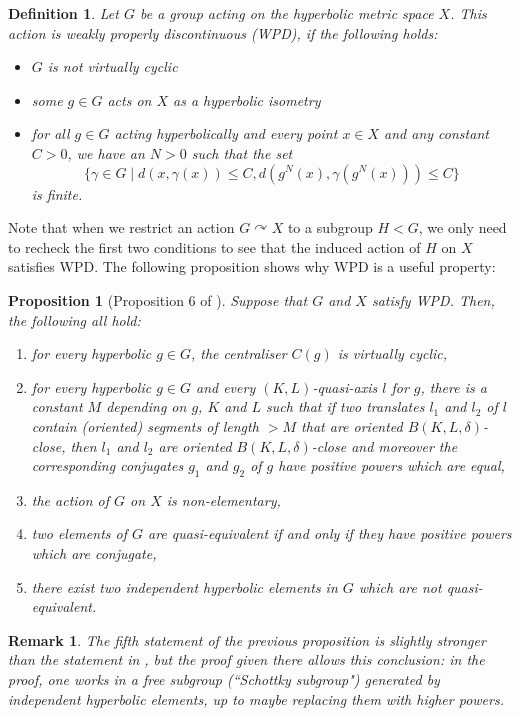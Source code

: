 \documentclass[10pt,a4paper]{amsart}
\newtheorem{remark}[theorem]{Remark}
\newtheorem{definition}[theorem]{Definition}
\newtheorem{proposition}[theorem]{Proposition}
\begin{document}
\begin{definition}\label{def:wpd}
    Let $G$ be a group acting on the hyperbolic metric space $X$.
    This action is \emph{weakly properly discontinuous (WPD)}, if the following holds: \begin{itemize}
        \item $G$ is not virtually cyclic
        \item some $g\in G$ acts on $X$ as a hyperbolic isometry
        \item for all $g\in G$ acting hyperbolically and every point $x\in X$ and any constant $C>0$, we have an $N>0$ such that the set 
        \[\{\gamma \in G \mid d(x,\gamma(x)) \leq C, d(g^N(x),\gamma(g^N(x)))\leq C \}\]
        is finite.
    \end{itemize}
    \end{definition}
Note that when we restrict an action $G\curvearrowright X$ to a subgroup $H<G$, we only need to recheck the first two conditions to see that the induced action of $H$ on $X$ satisfies WPD.
The following proposition shows why WPD is a useful property:

\begin{proposition}[Proposition 6 of \cite{Bestvina}]\label{prop:useful-wpd}
    Suppose that $G$ and $X$ satisfy WPD.
    Then, the following all hold: 
    \begin{enumerate}
        \item for every hyperbolic $g\in G$, the centraliser $C(g)$ is virtually cyclic,
        \item for every hyperbolic $g\in G$ and every $(K,L)$-quasi-axis $l$ for $g$, there is a constant $M$ depending on $g$, $K$ and $L$ such that if two translates $l_1$ and $l_2$ of $l$ contain (oriented) segments of length $>M$ that are oriented $B(K,L,\delta)$-close, then $l_1$ and $l_2$ are oriented $B(K,L,\delta)$-close and moreover the corresponding conjugates $g_1$ and $g_2$ of $g$ have positive powers which are equal,
        \item the action of $G$ on $X$ is non-elementary,
        \item two elements of $G$ are quasi-equivalent if and only if they have positive powers which are conjugate,
        \item there exist two independent hyperbolic elements in $G$ which are not quasi-equivalent.
    \end{enumerate}
\end{proposition}

\begin{remark}
    The fifth statement of the previous proposition is slightly stronger than the statement in \cite{Bestvina}, but the proof given there allows this conclusion:
    in the proof, one works in a free subgroup (``Schottky subgroup") generated by independent hyperbolic elements, up to maybe replacing them with higher powers.
\end{remark}
\end{document}
